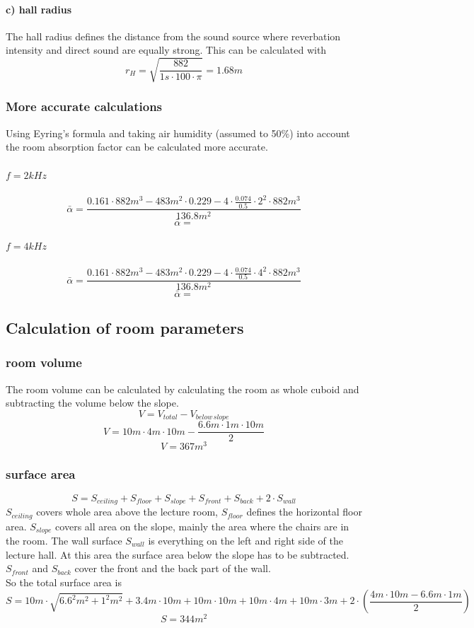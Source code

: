 \documentclass{article}
\begin{document}
\paragraph{c) hall radius\\}
The hall radius defines the distance from the sound source where reverbation intensity and direct sound are equally strong. This can be calculated with
$$r_H=\sqrt{\frac{882}{1s\cdot 100\cdot \pi}}=1.68m$$
\subsubsection{More accurate calculations}
Using Eyring's formula and taking air humidity (assumed to 50\%) into account the room absorption factor can be calculated more accurate.
\paragraph{$f=2kHz$}
$$\bar{\alpha}=\frac{0.161\cdot 882m^3-483m^2\cdot 0.229-4\cdot \frac{0.074}{0.5}\cdot 2^2\cdot 882m^3}{136.8m^2}$$
$$\bar{\alpha}=$$
\paragraph{$f=4kHz$}
$$\bar{\alpha}=\frac{0.161\cdot 882m^3-483m^2\cdot 0.229-4\cdot \frac{0.074}{0.5}\cdot 4^2\cdot 882m^3}{136.8m^2}$$
$$\bar{\alpha}=$$
\subsection{Calculation of room parameters\label{sec:roomparam}}
\subsubsection{room volume}
The room volume can be calculated by calculating the room as whole cuboid and subtracting the volume below the slope.
\begin{equation}
V=V_{total}-V_{below\,slope}
\end{equation}
$$V=10m\cdot 4m\cdot 10m-\frac{6.6m\cdot 1m\cdot 10m}{2}$$
$$V=367m^3$$
\subsubsection{surface area}
\begin{equation}
S=S_{ceiling}+S_{floor}+S_{slope}+S_{front}+S_{back}+2\cdot S_{wall}
\end{equation}
$S_{ceiling}$ covers whole area above the lecture room, $S_{floor}$ defines the horizontal floor area. $S_{slope}$ covers all area on the slope, mainly the area where the chairs are in the room. The wall surface $S_{wall}$ is everything on the left and right side of the lecture hall. At this area the surface area below the slope has to be subtracted. $S_{front}$ and $S_{back}$ cover the front and the back part of the wall.\\
So the total surface area is
$$S=10m\cdot\sqrt{6.6^2m^2+1^2m^2}+3.4m\cdot 10m+10m\cdot 10m+10m\cdot 4m+10m\cdot 3m+2\cdot(\frac{4m\cdot 10m-6.6m\cdot 1m}{2})$$
$$S=344m^2$$
\newpage
\end{document}
